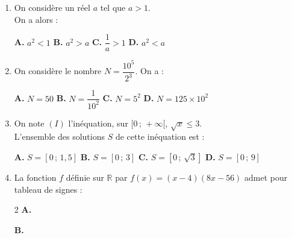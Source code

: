 \documentclass[a4paper,11pt]{article}
\begin{document}
\begin{seance}{} %

\begin{enumerate}
\item On considère un réel $a$ tel que $a > 1$. \\On a alors :

\begin{center}
\textbf{\textcolor{Couleur1}{A.}} $a^2 < 1$ \qquad \textbf{\textcolor{Couleur1}{B.}} $a^2 > a$ \qquad \textbf{\textcolor{Couleur1}{C.}} $\dfrac{1}{a} > 1$ \qquad \textbf{\textcolor{Couleur1}{D.}} $a^2 < a$
\end{center}


\item On considère le nombre $N=\dfrac{10^5}{2^3}$. On a :
\begin{center}
\textbf{\textcolor{Couleur1}{A.}} $N=50$ \qquad \textbf{\textcolor{Couleur1}{B.}} $N=\dfrac{1}{10^{2}}$ \qquad \textbf{\textcolor{Couleur1}{C.}} $N=5^{2}$ \qquad \textbf{\textcolor{Couleur1}{D.}} $N=125\times 10^{2}$
\end{center}


\item On note $(I)$ l'inéquation, sur $[0\,;\,+\infty[$, $\sqrt{x} \leqslant  3$.
         \\L'ensemble des solutions $S$ de cette inéquation est :

\begin{center}
\textbf{\textcolor{Couleur1}{A.}} $S = [0\,;\,1{,}5]$ \qquad \textbf{\textcolor{Couleur1}{B.}} $S = [0\,;\,3]$ \qquad \textbf{\textcolor{Couleur1}{C.}} $S = [0\,;\,\sqrt{3}]$ \qquad \textbf{\textcolor{Couleur1}{D.}} $S = [0\,;\,9]$
\end{center}


\item La fonction $f$ définie sur $\mathbb{R}$ par $f(x)=(x-4)(8x-56)$ admet pour tableau de signes :
\begin{multicols}{2}
\textbf{\textcolor{Couleur1}{A.}} 

\textbf{\textcolor{Couleur1}{B.}} 


\end{multicols}
\end{enumerate}
\end{seance}
\end{document}
